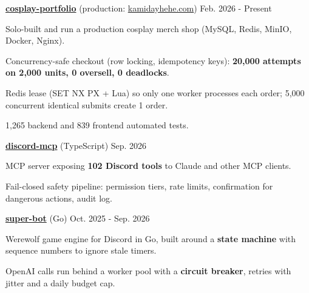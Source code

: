 \begin{cventries} %
  \cvsimpleentry
    {\href{https://github.com/phuc16/cosplay-portfolio}{\textbf{cosplay-portfolio}} (production: \href{https://kamidayhehe.com}{kamidayhehe.com})} %
    {Feb. 2026 - Present} %
    {
      \begin{cvitems} %
        \item {Solo-built and run a production cosplay merch shop (MySQL, Redis, MinIO, Docker, Nginx).}
        \item {Concurrency-safe checkout (row locking, idempotency keys): \textbf{20,000 attempts on 2,000 units, 0 oversell, 0 deadlocks}.}
        \item {Redis lease (SET NX PX + Lua) so only one worker processes each order; 5,000 concurrent identical submits create 1 order.}
        \item {1,265 backend and 839 frontend automated tests.}
      \end{cvitems}
    }

  \cvsimpleentry
    {\href{https://github.com/phuc16/discord-mcp}{\textbf{discord-mcp}} (TypeScript)} %
    {Sep. 2026} %
    {
      \begin{cvitems} %
        \item {MCP server exposing \textbf{102 Discord tools} to Claude and other MCP clients.}
        \item {Fail-closed safety pipeline: permission tiers, rate limits, confirmation for dangerous actions, audit log.}
      \end{cvitems}
    }

  \cvsimpleentry
    {\href{https://github.com/phuc16/super-bot}{\textbf{super-bot}} (Go)} %
    {Oct. 2025 - Sep. 2026} %
    {
      \begin{cvitems} %
        \item {Werewolf game engine for Discord in Go, built around a \textbf{state machine} with sequence numbers to ignore stale timers.}
        \item {OpenAI calls run behind a worker pool with a \textbf{circuit breaker}, retries with jitter and a daily budget cap.}
      \end{cvitems}
    }
\end{cventries}
